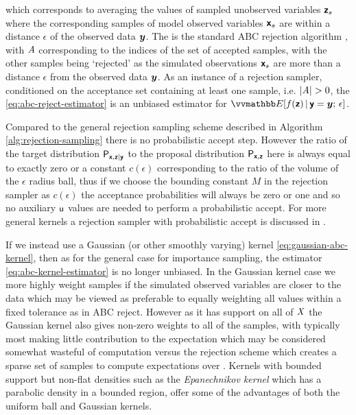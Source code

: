 which corresponds to averaging the values of sampled unobserved variables $\boldsymbol{\mathsf{z}}_s$ where the corresponding samples of model observed variables $\boldsymbol{\mathsf{x}}_s$ are within a distance $\epsilon$ of the observed data $\boldsymbol{y}$. The is the standard \ac{ABC} rejection algorithm \citep{rubin1984bayesianly,tavare1997inferring,fu1997estimating,weiss1998inference,pritchard1999population} , with $\mathit{A}$ corresponding to the indices of the set of accepted samples, with the other samples being `rejected' as the simulated observations $\boldsymbol{\mathsf{x}}_s$ are more than a distance $\epsilon$ from the observed data $\boldsymbol{y}$. As an instance of a rejection sampler, conditioned on the acceptance set containing at least one sample, i.e. $|\mathit{A}| > 0$, the \eqref{eq:abc-reject-estimator} is an unbiased estimator for $\expc{f(\rvct{z}) \gvn \rvct{y} = \vct{y};\,\epsilon}$. 

Compared to the general rejection sampling scheme described in Algorithm \ref{alg:rejection-sampling} there is no probabilistic accept step. However the ratio of the target distribution $\mathsf{P}_{\boldsymbol{\mathsf{x}},\boldsymbol{\mathsf{z}}|\boldsymbol{\mathsf{y}}}$ to the proposal distribution $\mathsf{P}_{\boldsymbol{\mathsf{x}},\boldsymbol{\mathsf{z}}}$ here is always equal to exactly zero or a constant $c(\epsilon)$ corresponding to the ratio of the volume of the $\epsilon$ radius ball, thus if we choose the bounding constant $M$ in the rejection sampler as $c(\epsilon)$ the acceptance probabilities will always be zero or one and so no auxiliary $\mathsf{u}$ values are needed to perform a probabilistic accept. For more general kernels a rejection sampler with probabilistic accept is discussed in \citep{wilkinson2013approximate}.

If we instead use a Gaussian (or other smoothly varying) kernel \eqref{eq:gaussian-abc-kernel}, then as for the general case for importance sampling, the estimator \eqref{eq:abc-kernel-estimator} is no longer unbiased. In the Gaussian kernel case we more highly weight samples if the simulated observed variables are closer to the data which may be viewed as preferable to equally weighting all values within a fixed tolerance as in \ac{ABC} reject. However as it has support on all of $\mathit{X}$ the Gaussian kernel also gives non-zero weights to all of the samples, with typically most making little contribution to the expectation which may be considered somewhat wasteful of computation versus the rejection scheme which creates a sparse set of samples to compute expectations over \citep{beaumont2002approximate}. Kernels with bounded support but non-flat densities such as the \emph{Epanechnikov kernel} \citep{epanechnikov1969non} which has a parabolic density in a bounded region, offer some of the advantages of both the uniform ball and Gaussian kernels.

